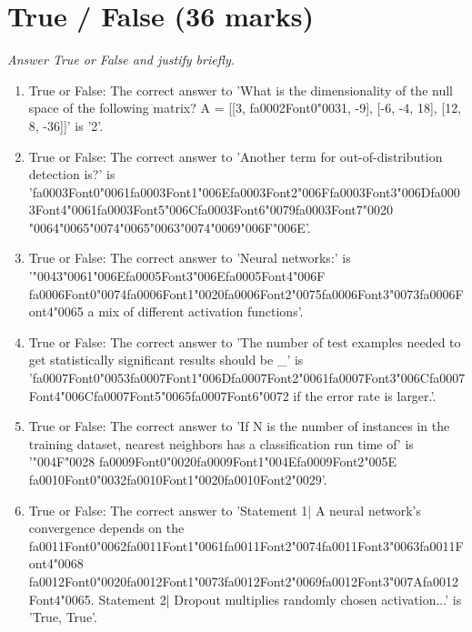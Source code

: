 \documentclass[12pt]{article}
\begin{document}
\section*{True / False (36 marks)}
\textit{Answer True or False and justify briefly.}
\begin{enumerate}[label=\arabic*.]
\item True or False: The correct answer to 'What is the dimensionality of the null space of the following matrix? A = [[3, {\csname fa0002Font0\endcsname\char"0031}, -9], [-6, -4, 18], [12, 8, -36]]' is '2'.
\item True or False: The correct answer to 'Another term for out-of-distribution detection is?' is '{\csname fa0003Font0\endcsname\char"0061}{\csname fa0003Font1\endcsname\char"006E}{\csname fa0003Font2\endcsname\char"006F}{\csname fa0003Font3\endcsname\char"006D}{\csname fa0003Font4\endcsname\char"0061}{\csname fa0003Font5\endcsname\char"006C}{\csname fa0003Font6\endcsname\char"0079}{\csname fa0003Font7\endcsname\char"0020} {\char"0064}{\char"0065}{\char"0074}{\char"0065}{\char"0063}{\char"0074}{\char"0069}{\char"006F}{\char"006E}'.
\item True or False: The correct answer to 'Neural networks:' is '{\char"0043}{\char"0061}{\char"006E}{\csname fa0005Font3\endcsname\char"006E}{\csname fa0005Font4\endcsname\char"006F} {\csname fa0006Font0\endcsname\char"0074}{\csname fa0006Font1\endcsname\char"0020}{\csname fa0006Font2\endcsname\char"0075}{\csname fa0006Font3\endcsname\char"0073}{\csname fa0006Font4\endcsname\char"0065} a mix of different activation functions'.
\item True or False: The correct answer to 'The number of test examples needed to get statistically significant results should be \_' is '{\csname fa0007Font0\endcsname\char"0053}{\csname fa0007Font1\endcsname\char"006D}{\csname fa0007Font2\endcsname\char"0061}{\csname fa0007Font3\endcsname\char"006C}{\csname fa0007Font4\endcsname\char"006C}{\csname fa0007Font5\endcsname\char"0065}{\csname fa0007Font6\endcsname\char"0072} if the error rate is larger.'.
\item True or False: The correct answer to 'If N is the number of instances in the training dataset, nearest neighbors has a classification run time of' is '{\char"004F}{\char"0028} {\csname fa0009Font0\endcsname\char"0020}{\csname fa0009Font1\endcsname\char"004E}{\csname fa0009Font2\endcsname\char"005E} {\csname fa0010Font0\endcsname\char"0032}{\csname fa0010Font1\endcsname\char"0020}{\csname fa0010Font2\endcsname\char"0029}'.
\item True or False: The correct answer to 'Statement 1| A neural network's convergence depends on the {\csname fa0011Font0\endcsname\char"0062}{\csname fa0011Font1\endcsname\char"0061}{\csname fa0011Font2\endcsname\char"0074}{\csname fa0011Font3\endcsname\char"0063}{\csname fa0011Font4\endcsname\char"0068} {\csname fa0012Font0\endcsname\char"0020}{\csname fa0012Font1\endcsname\char"0073}{\csname fa0012Font2\endcsname\char"0069}{\csname fa0012Font3\endcsname\char"007A}{\csname fa0012Font4\endcsname\char"0065}. Statement 2| Dropout multiplies randomly chosen activation...' is 'True, True'.

\end{enumerate}
\end{document}
